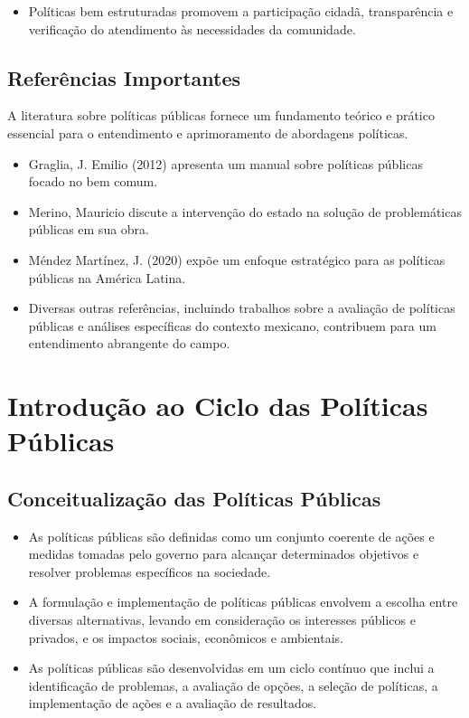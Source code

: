 \documentclass[
   article,       
   12pt,          
   oneside,       
   a4paper,       
   english,       
   brazil,        
   sumario=tradicional
   ]{abntex2}
\begin{document}
\begin{itemize}
    \item Políticas bem estruturadas promovem a participação cidadã, transparência e verificação do atendimento às necessidades da comunidade.
\end{itemize}

\subsection{Referências Importantes}

A literatura sobre políticas públicas fornece um fundamento teórico e prático essencial para o entendimento e aprimoramento de abordagens políticas.

\begin{itemize}
    \item Graglia, J. Emilio (2012) apresenta um manual sobre políticas públicas focado no bem comum.
    \item Merino, Mauricio discute a intervenção do estado na solução de problemáticas públicas em sua obra.
    \item Méndez Martínez, J. (2020) expõe um enfoque estratégico para as políticas públicas na América Latina.
    \item Diversas outras referências, incluindo trabalhos sobre a avaliação de políticas públicas e análises específicas do contexto mexicano, contribuem para um entendimento abrangente do campo.
\end{itemize}
\section{Introdução ao Ciclo das Políticas Públicas}
\subsection{Conceitualização das Políticas Públicas}
\begin{itemize}
    \item As políticas públicas são definidas como um conjunto coerente de ações e medidas tomadas pelo governo para alcançar determinados objetivos e resolver problemas específicos na sociedade.
    \item A formulação e implementação de políticas públicas envolvem a escolha entre diversas alternativas, levando em consideração os interesses públicos e privados, e os impactos sociais, econômicos e ambientais.
    \item As políticas públicas são desenvolvidas em um ciclo contínuo que inclui a identificação de problemas, a avaliação de opções, a seleção de políticas, a implementação de ações e a avaliação de resultados.
\end{itemize}
\end{document}

